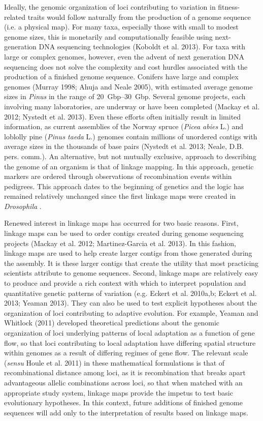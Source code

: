 \documentclass[11pt]{article}
\begin{document}
Ideally, the genomic organization of loci contributing to variation in fitness-related traits would follow 
naturally from the production of a genome sequence (i.e. a physical map). For many taxa, especially those with 
small to modest genome sizes, this is monetarily and computationally feasible using next-generation DNA sequencing 
technologies (Koboldt et al. 2013). For taxa with large or complex genomes, however, even the advent of next generation DNA 
sequencing does not solve the complexity and cost hurdles associated with the production of a finished genome sequence. Conifers have large and 
complex genomes (Murray 1998; Ahuja and Neale 2005), with estimated average genome sizes in \textit{Pinus} in the 
range of \SIrange{20}{30}{Gbp}. Several genome projects, each involving many laboratories, are underway or have been 
completed (Mackay et al. 2012; Nystedt et al. 2013). Even these efforts often initially result in limited information, 
as current assemblies of the Norway spruce (\textit{Picea abies} L.) and loblolly pine (\textit{Pinus taeda} L.) genomes 
contain millions of unordered contigs with average sizes in the thousands of base pairs (Nystedt et al. 2013; 
Neale, D.B. pers. comm.). An alternative, but not mutually exclusive, approach to describing the genome of an organism 
is that of linkage mapping. In this approach, genetic markers are ordered through observations of recombination events 
within pedigrees. This approach dates to the beginning of genetics and the logic has remained relatively unchanged 
since the first linkage maps were created in \textit{Drosophila} \citep{Sturtevant:1913}.

Renewed interest in linkage maps has occurred for two basic reasons. First, linkage maps can be used to order contigs 
created during genome sequencing projects (Mackay et al. 2012; Martinez-Garcia et al. 2013). In this fashion, linkage 
maps are used to help create larger contigs from those generated during the assembly. It is these larger contigs that 
create the utility that most practicing scientists attribute to genome sequences. Second, linkage maps are relatively 
easy to produce and provide a rich context with which to interpret population and quantitative genetic patterns of variation 
(e.g. Eckert et al. 2010a,b; Eckert et al. 2013; Yeaman 2013). They can also be used to test explicit hypotheses about 
the organization of loci contributing to adaptive evolution. For example, Yeaman and Whitlock (2011) developed theoretical 
predictions about the genomic organization of loci underlying patterns of local adaptation as a function of gene flow, 
so that loci contributing to local adaptation have differing spatial structure within genomes as a result of differing 
regimes of gene flow. The relevant scale (\textit{sensu} Houle et al. 2011) in these mathematical formulations is that 
of recombinational distance among loci, as it is recombination that breaks apart advantageous allelic combinations across 
loci, so that when matched with an appropriate study system, linkage maps provide the impetus to test basic evolutionary 
hypotheses. In this context, future additions of finished genome sequences will add only to the interpretation of 
results based on linkage maps.
\end{document}
